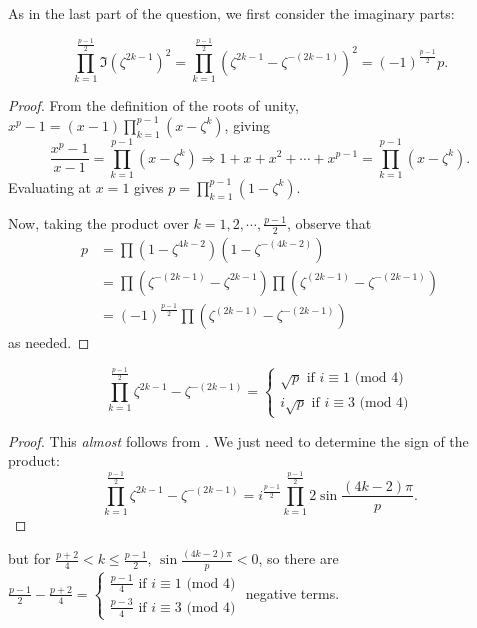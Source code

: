 \documentclass[../main.tex]{subfiles}
\begin{document}
As in the last part of the question, we first consider the imaginary parts:
\begin{proposition}\label{prop-0.13}
$$\prod_{k=1}^{\frac{p-1}{2}}\Im(\zeta^{2k-1})^2=\prod_{k=1}^{\frac{p-1}{2}}(\zeta^{2k-1}-\zeta^{-(2k-1)})^2=(-1)^{\frac{p-1}{2}}p.$$
\end{proposition}
\begin{proof}
From the definition of the roots of unity, $x^p-1=(x-1)\prod_{k=1}^{p-1}(x-\zeta^k)$, giving
$$\frac{x^p-1}{x-1}=\prod_{k=1}^{p-1}(x-\zeta^k) \Longrightarrow 1+x+x^2+\cdots+x^{p-1}=\prod_{k=1}^{p-1}(x-\zeta^k).$$
Evaluating at $x=1$ gives $p=\prod_{k=1}^{p-1}(1-\zeta^k).$

Now, taking the product over $k=1,2,\cdots,\frac{p-1}{2}$, observe that
\begin{align*}
    p&=\prod(1-\zeta^{4k-2})(1-\zeta^{-(4k-2)}) \\
    &=\prod(\zeta^{-(2k-1)}-\zeta^{2k-1})\prod(\zeta^{(2k-1)}-\zeta^{-(2k-1)}) \\
    &=(-1)^{\frac{p-1}{2}}\prod(\zeta^{(2k-1)}-\zeta^{-(2k-1)})
\end{align*}
as needed.
\end{proof}
\begin{proposition}
$$\prod_{k=1}^{\frac{p-1}{2}}\zeta^{2k-1}-\zeta^{-(2k-1)}=
\begin{cases}
\sqrt{p} \text{ if $i \equiv 1$ (mod 4)} \\
i\sqrt{p} \text{ if $i \equiv 3$ (mod 4)}
\end{cases}$$
\end{proposition}
\begin{proof}
This \textit{almost} follows from . We just need to determine the sign of the product:
$$\prod_{k=1}^{\frac{p-1}{2}}\zeta^{2k-1}-\zeta^{-(2k-1)}=i^{\frac{p-1}{2}}\prod_{k=1}^{\frac{p-1}{2}}2\sin{\frac{(4k-2)\pi}{p}}.$$
\end{proof}
but for $\frac{p+2}{4} < k \leq \frac{p-1}{2}$, $\sin{\frac{(4k-2)\pi}{p}} < 0$, so there are $\frac{p-1}{2}-\frac{p+2}{4}=
\begin{cases}
\frac{p-1}{4} \text{ if $i\equiv 1$ (mod 4)} \\
\frac{p-3}{4} \text{ if $i\equiv 3$ (mod 4)}
\end{cases}$ negative terms.
\end{document}
